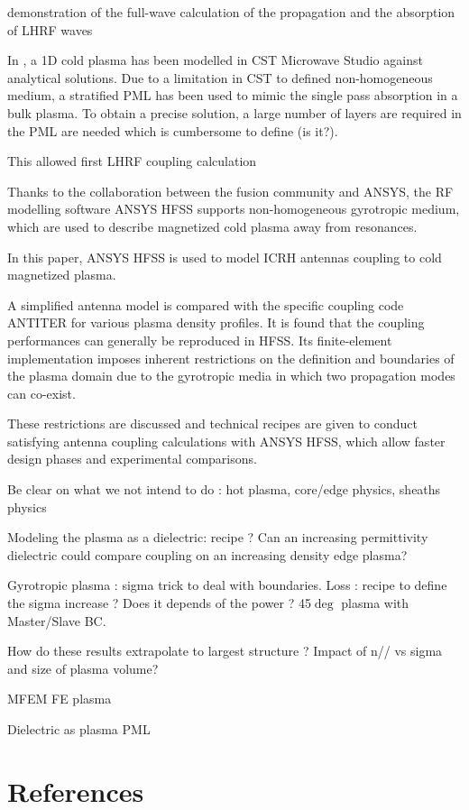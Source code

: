 \documentclass[preprint,3p,twocolumn]{elsarticle}
\begin{document}
  


demonstration of the full-wave calculation of the propagation and the absorption of LHRF waves \cite{Meneghini2009, } 




In \cite{Louche2017}, a 1D cold plasma has been modelled in CST Microwave Studio against analytical solutions. Due to a limitation in CST to defined non-homogeneous medium, a stratified PML has been used to mimic the single pass absorption in a bulk plasma. To obtain a precise solution, a large number of layers are required in the PML are needed which is cumbersome to define (is it?).   

This allowed first LHRF coupling calculation 



Thanks to the collaboration between the fusion community and ANSYS, the RF modelling software ANSYS HFSS supports non-homogeneous gyrotropic medium, which are used to describe magnetized cold plasma away from resonances. 

In this paper, ANSYS HFSS is used to model ICRH antennas coupling to cold magnetized plasma. 

A simplified antenna model is compared with the specific coupling code ANTITER for various plasma density profiles. It is found that the coupling performances can generally be reproduced in HFSS. Its finite-element implementation imposes inherent restrictions on the definition and boundaries of the plasma domain due to the gyrotropic media in which two propagation modes can co-exist. 

These restrictions are discussed and technical recipes are given to conduct satisfying antenna coupling calculations with ANSYS HFSS, which allow faster design phases and experimental comparisons. 

Be clear on what we not intend to do : hot plasma, core/edge physics, sheaths physics

Modeling the plasma as a dielectric: recipe ? Can an increasing permittivity dielectric could compare  coupling on an increasing density edge plasma? 

Gyrotropic plasma : sigma trick to deal with boundaries.
Loss : recipe to define the sigma increase ? Does it depends of the power ?
45$\deg$ plasma with Master/Slave BC. 



How do these results extrapolate to largest structure ? Impact of n// vs sigma and size of plasma volume? 

MFEM FE plasma \cite{Shiraiwa2017}

Dielectric as plasma
PML \cite{Becache2016}




\section*{References}


\end{document}
